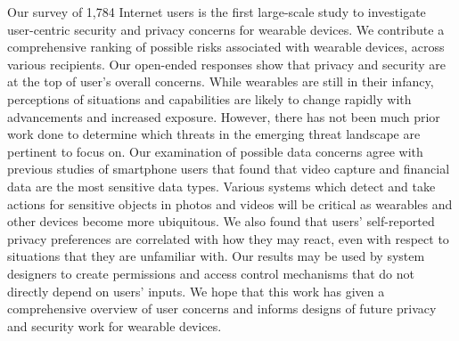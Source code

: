 \documentclass{sig-alternate-hotpets15}
\begin{document}
 Our survey of 1,784 Internet users is the first large-scale study to investigate user-centric security and privacy concerns for wearable devices. We contribute a comprehensive ranking of possible risks associated with wearable devices, across various recipients. Our open-ended responses show that privacy and security are at the top of user's overall concerns. While wearables are still in their infancy, perceptions of situations and capabilities are likely to change rapidly with advancements and increased exposure. However, there has not been much prior work done to determine which threats in the emerging threat landscape are pertinent to focus on. Our examination of possible data concerns agree with previous studies of smartphone users that found that video capture and financial data are the most sensitive data types. Various systems which detect and take actions for sensitive objects in photos and videos will be critical as wearables and other devices become more ubiquitous. We also found that users' self-reported privacy preferences are correlated with how they may react, even with respect to situations that they are unfamiliar with. Our results may be used by system designers to create permissions and access control mechanisms that do not directly depend on users' inputs. We hope that this work has given a comprehensive overview of user concerns and informs designs of future privacy and security work for wearable devices. 


 



\end{document}
